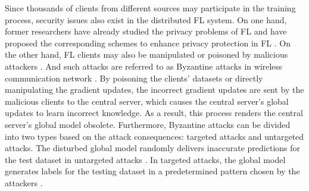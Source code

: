 \documentclass[journal]{IEEEtran}
\begin{document}
\par Since thousands of clients from different sources may participate in the training process, security issues also exist in the distributed FL system. On one hand, former researchers have already studied the privacy problems of FL and have proposed the corresponding schemes to enhance privacy protection in FL \cite{ref_33_privacy, ref_34_VerifyNet, wang2019beyond}. On the other hand, FL clients may also be manipulated or poisoned by malicious attackers \cite{miao2018attack, laishram2016curie}. And such attacks are referred to as Byzantine attacks in wireless communication network \cite{ref_36_Byzantine,ref_37_Byzantine,ref_38_Byzantine,ref_40_Byzantine}. By poisoning the clients' datasets or directly manipulating the gradient updates, the incorrect gradient updates are sent by the malicious clients to the central server, which causes the central server's global updates to learn incorrect knowledge. As a result, this process renders the central server's global model obsolete. Furthermore, Byzantine attacks can be divided into two types based on the attack consequences: targeted attacks and untargeted attacks. The disturbed global model randomly delivers inaccurate predictions for the test dataset in untargeted attacks \cite{ref_04_model,ref_06_model,ref_07_data,yang2017generative,sun2018data}. In targeted attacks, the global model generates labels for the testing dataset in a predetermined pattern chosen by the attackers \cite{ref_08_data,ref_09_backdoor,ref_10_backdoor,ref_11_backdoor,ref_19_backdoor}.
\end{document}
